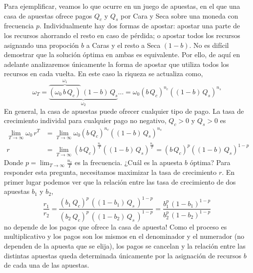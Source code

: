 \documentclass[a4paper,10pt]{book}
\theoremstyle{definition}
\begin{document}

Para ejemplificar, veamos lo que ocurre en un juego de apuestas, en el que una casa de apuestas ofrece pagos $Q_c$ y $Q_s$ por Cara y Seca sobre una moneda con frecuencia $p$.
%
Individualmente hay dos formas de apostar: apostar una parte de los recursos ahorrando el resto en caso de pérdida; o apostar todos los recursos asignando una propoción $b$ a Caras y el resto a Seca $(1-b)$.
%
No es dif\'icil demostrar que la solución óptima en ambas es equivalente.
%
Por ello, de aqu\'i en adelante analizaremos \'unicamente la forma de apostar que utiliza todos los recursos en cada vuelta.
%
En este caso la riqueza se actualiza como,
%
\begin{equation} \label{eq:kelly_paraconsistente}
\omega_T = \underbrace{\overbrace{(\omega_0 \, b \, Q_c)}^{\omega_1} \,  (1-b) \, Q_s}_{\omega_2} \dots = \omega_0 (b \, Q_c)^{n_c} ((1-b) \, Q_s )^{n_s}
\end{equation}
%
En general, la casa de apuestas puede ofrecer cualquier tipo de pago.
%
La tasa de crecimiento individal para cualquier pago no negativo, $Q_c > 0$ y $Q_s > 0$ es
%
\begin{equation}
\begin{split}
\lim_{T \rightarrow \infty } \omega_0 \, r^T &= \lim_{T \rightarrow \infty } \omega_0 (b \, Q_c)^{n_c} ((1-b) \, Q_s )^{n_s} \\
r &= \lim_{T \rightarrow \infty } (b \, Q_c)^{\frac{n_c}{T}} ((1-b) \, Q_s )^{\frac{n_s}{T}} = (b \, Q_c)^{p} ((1-b) \, Q_s )^{1-p}
\end{split}
\end{equation}
%
Donde $p = \lim_{T \rightarrow \infty} \frac{n_s}{T}$ es la frecuencia.
%
¿Cuál es la apuesta $b$ óptima?
%
Para responder esta pregunta, necesitamos maximizar la tasa de crecimiento $r$. 
%
En primer lugar podemos ver que la relación entre las tasa de crecimiento de dos apuestas $b_1$ y $b_2$,
%
\begin{equation}
\frac{r_1}{r_2} = \frac{(b_1 \  Q_c)^{p}  \,  ((1-b_1) \, Q_s \, )^{1-p} }{(b_2 \  Q_c)^{p}  \,  ((1-b_2) \, Q_s \, )^{1-p}  } = \frac{b_1^{p}  \,  (1-b_1)^{1-p} }{b_2^{p}  \,  (1-b_2)^{1-p} }
\end{equation}
%
no depende de los pagos que ofrece la casa de apuesta!
%
Como el proceso es multiplicativo y los pagos son los mismos en el denominador y el numerador (no dependen de la apuesta que se elija), los pagos se cancelan y la relación entre las distintas apuestas queda determinada \'unicamente por la asignación de recursos $b$ de cada una de las apuestas. 
\end{document}
